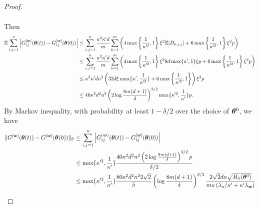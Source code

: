 \documentclass{article}
\begin{document}
\begin{proof}
\begin{enumerate}[(a)]
\begin{enumerate}[(i)]
\begin{equation}
\begin{aligned}
                            \end{aligned}
                        \end{equation}
                        Then
                        \begin{equation}
                            \begin{aligned}
                                \mathbb{E}\sum_{i,j=1}^n\left\lvert G_{ij}^{[\bm{w}]}(\bm{\theta}(t))-G_{ij}^{[\bm{w}]}(\bm{\theta}(0))\right\rvert
                                 & \leq\sum_{i,j=1}^n\frac{\kappa^2\kappa' d}{m}\sum_{k=1}^m\left(4\max\left\{\frac{1}{\kappa'^2},1\right\}\xi^2\mathbb{E}|D_{k,i,j}|+6\max\left\{\frac{1}{\kappa'^2},1\right\}\xi^2 p\right)           \\
                                 & \leq\sum_{i,j=1}^n\frac{\kappa^2\kappa' d}{m}\sum_{k=1}^m\left(4\max\left\{\frac{1}{\kappa'^2},1\right\}\xi^2 8d\max\{\kappa',1\}\xi p+6\max\left\{\frac{1}{\kappa'^2},1\right\}\xi^2 p\right) \\
                                 & \leq \kappa^2\kappa' d n^2\left(32d\xi\max\{\kappa',\frac{1}{\kappa'^2} \}   +6\max\left\{\frac{1}{\kappa'^2},1\right\}\right)\xi^2 p                                               \\
                                 & \leq 40\kappa^2 d^2n^2\left(2\log\frac{8m(d+1)}{\delta}\right)^{3/2}\max\{\kappa'^2,\frac{1}{\kappa'}\} p.
                            \end{aligned}
                        \end{equation}
                        By Markov inequality, with probability at least $1-\delta/2$ over the choice of $\bm{\theta}^0$, we have
                        \begin{equation}
                            \begin{aligned}
                                \norm{G^{[\vw]}(\vtheta(t))-G^{[\vw]}(\vtheta(0))}_\mathrm{F}
                                 & \leq \sum_{i,j=1}^n\Big|G_{ij}^{(\vw)}(\vtheta(t))-G^{[\vw]}_{ij}(\vtheta(0))\Big|                                                                                                                                                 \\
                                 & \leq \max\{\kappa'^2,\frac{1}{\kappa'}\}\frac{40\kappa^2 d^2n^2\left(2\log\frac{8m(d+1)}{\delta}\right)^{3/2} p}{\delta/2}                                                                                                         \\
                                 & \leq \max\{\kappa'^2,\frac{1}{\kappa'}\}\frac{80\kappa^2 d^2n^2 2\sqrt{2}}{\delta}\left(\log\frac{8m(d+1)}{\delta}\right)^{3/2}\frac{2\sqrt{2}dn\sqrt{\RS(\vtheta^0)}}{m\kappa\left(\lambda_a/\kappa'+\kappa'\lambda_{\vw}\right)} \\

\end{aligned}
\end{equation}
\end{enumerate}
\end{enumerate}
\end{proof}
\end{document}

